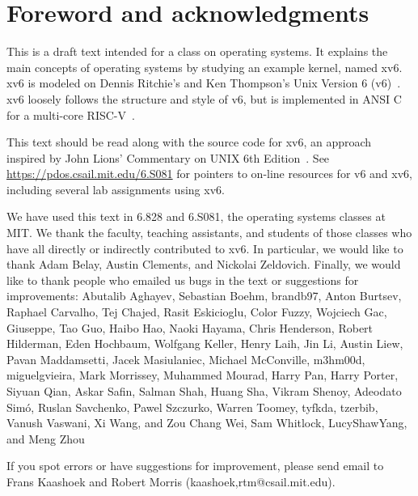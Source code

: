\chapter*{Foreword and acknowledgments}


This is a draft text intended for a class on operating systems. It
explains the main concepts of operating systems by studying an example
kernel, named xv6.  xv6 is modeled on Dennis Ritchie's and
Ken Thompson's Unix Version 6 (v6)~\cite{unix}.  xv6 loosely follows the structure
and style of v6, but is implemented in ANSI C~\cite{kernighan} for 
a multi-core RISC-V~\cite{riscv}.

This text should be read along with the source code for xv6, an approach 
inspired by John Lions' Commentary on UNIX 6th Edition~\cite{lions}. See
\url{https://pdos.csail.mit.edu/6.S081} for pointers to on-line
resources for v6 and xv6, including several lab assignments
using xv6.

We have used this text in 6.828 and 6.S081, the operating systems
classes at MIT.  We thank the faculty, teaching assistants, and
students of those classes who have all directly or indirectly
contributed to xv6.  In particular, we would like to thank Adam Belay,
Austin Clements, and Nickolai Zeldovich.  Finally, we would like to
thank people who emailed us bugs in the text or suggestions for
improvements: Abutalib Aghayev, Sebastian Boehm, brandb97, Anton
Burtsev, Raphael Carvalho, Tej Chajed, Rasit Eskicioglu, Color Fuzzy,
Wojciech Gac, Giuseppe, Tao Guo, Haibo Hao, Naoki Hayama, Chris
Henderson, Robert Hilderman, Eden Hochbaum, Wolfgang Keller, Henry
Laih, Jin Li, Austin Liew, Pavan Maddamsetti, Jacek Masiulaniec,
Michael McConville, m3hm00d, miguelgvieira, Mark Morrissey, Muhammed
Mourad, Harry Pan, Harry Porter, Siyuan Qian, Askar Safin, Salman
Shah, Huang Sha, Vikram Shenoy,  Adeodato Simó, Ruslan Savchenko, Pawel Szczurko,
Warren Toomey, tyfkda, tzerbib, Vanush Vaswani, Xi Wang, and Zou Chang
Wei, Sam Whitlock, LucyShawYang, and Meng Zhou

If you spot errors or have suggestions for improvement, please send email to
Frans Kaashoek and Robert Morris (kaashoek,rtm@csail.mit.edu).
